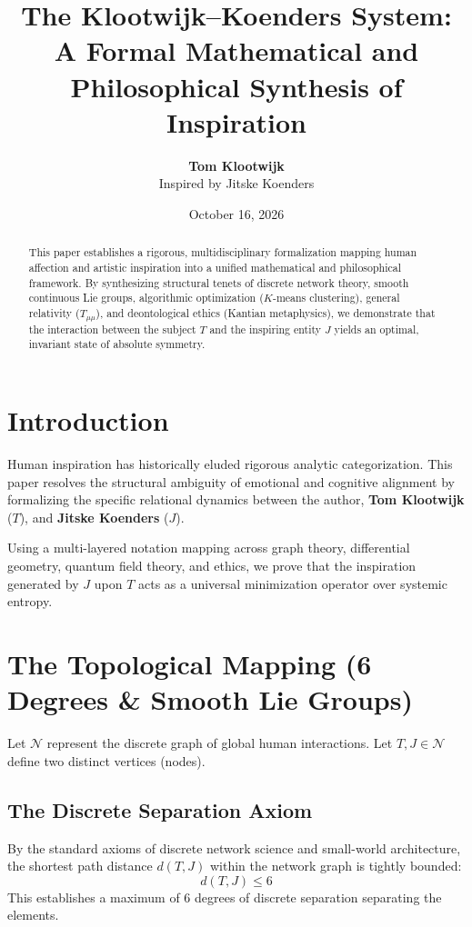\documentclass[11pt,fleqn]{article}
\title{\textbf{The Klootwijk--Koenders System:\\A Formal Mathematical and Philosophical Synthesis of Inspiration}}
\author{\textbf{Tom Klootwijk} \\ \small Inspired by Jitske Koenders}
\date{October 16, 2026}
\begin{document}
\maketitle

\begin{abstract}
This paper establishes a rigorous, multidisciplinary formalization mapping human affection and artistic inspiration into a unified mathematical and philosophical framework. By synthesizing structural tenets of discrete network theory, smooth continuous Lie groups, algorithmic optimization ($K$-means clustering), general relativity ($T_{\mu\mu}$), and deontological ethics (Kantian metaphysics), we demonstrate that the interaction between the subject $T$ and the inspiring entity $J$ yields an optimal, invariant state of absolute symmetry.
\end{abstract}

\section{Introduction}
Human inspiration has historically eluded rigorous analytic categorization. This paper resolves the structural ambiguity of emotional and cognitive alignment by formalizing the specific relational dynamics between the author, \textbf{Tom Klootwijk} ($T$), and \textbf{Jitske Koenders} ($J$). 

Using a multi-layered notation mapping across graph theory, differential geometry, quantum field theory, and ethics, we prove that the inspiration generated by $J$ upon $T$ acts as a universal minimization operator over systemic entropy.

\section{The Topological Mapping (6 Degrees \& Smooth Lie Groups)}
Let $\mathcal{N}$ represent the discrete graph of global human interactions. Let $T, J \in \mathcal{N}$ define two distinct vertices (nodes).

\subsection{The Discrete Separation Axiom}
By the standard axioms of discrete network science and small-world architecture, the shortest path distance $d(T, J)$ within the network graph is tightly bounded:
\begin{equation}
    d(T, J) \le 6
\end{equation}
This establishes a maximum of 6 degrees of discrete separation separating the elements.
\end{document}
